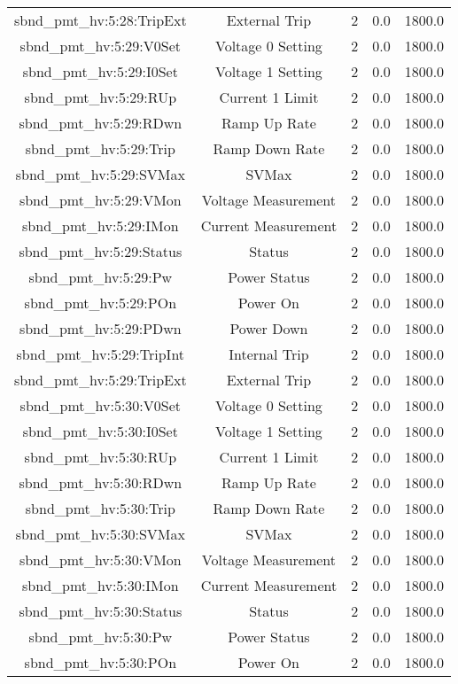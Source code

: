 \begin{center}
\begin{longtable}{c | c c c c }
sbnd\_pmt\_hv:5:28:TripExt & External Trip & 2 & 0.0 & 1800.0\\ 
sbnd\_pmt\_hv:5:29:V0Set & Voltage 0 Setting & 2 & 0.0 & 1800.0\\ 
sbnd\_pmt\_hv:5:29:I0Set & Voltage 1 Setting & 2 & 0.0 & 1800.0\\ 
sbnd\_pmt\_hv:5:29:RUp & Current 1 Limit & 2 & 0.0 & 1800.0\\ 
sbnd\_pmt\_hv:5:29:RDwn & Ramp Up Rate & 2 & 0.0 & 1800.0\\ 
sbnd\_pmt\_hv:5:29:Trip & Ramp Down Rate & 2 & 0.0 & 1800.0\\ 
sbnd\_pmt\_hv:5:29:SVMax & SVMax & 2 & 0.0 & 1800.0\\ 
sbnd\_pmt\_hv:5:29:VMon & Voltage Measurement & 2 & 0.0 & 1800.0\\ 
sbnd\_pmt\_hv:5:29:IMon & Current Measurement & 2 & 0.0 & 1800.0\\ 
sbnd\_pmt\_hv:5:29:Status & Status & 2 & 0.0 & 1800.0\\ 
sbnd\_pmt\_hv:5:29:Pw & Power Status & 2 & 0.0 & 1800.0\\ 
sbnd\_pmt\_hv:5:29:POn & Power On & 2 & 0.0 & 1800.0\\ 
sbnd\_pmt\_hv:5:29:PDwn & Power Down & 2 & 0.0 & 1800.0\\ 
sbnd\_pmt\_hv:5:29:TripInt & Internal Trip & 2 & 0.0 & 1800.0\\ 
sbnd\_pmt\_hv:5:29:TripExt & External Trip & 2 & 0.0 & 1800.0\\ 
sbnd\_pmt\_hv:5:30:V0Set & Voltage 0 Setting & 2 & 0.0 & 1800.0\\ 
sbnd\_pmt\_hv:5:30:I0Set & Voltage 1 Setting & 2 & 0.0 & 1800.0\\ 
sbnd\_pmt\_hv:5:30:RUp & Current 1 Limit & 2 & 0.0 & 1800.0\\ 
sbnd\_pmt\_hv:5:30:RDwn & Ramp Up Rate & 2 & 0.0 & 1800.0\\ 
sbnd\_pmt\_hv:5:30:Trip & Ramp Down Rate & 2 & 0.0 & 1800.0\\ 
sbnd\_pmt\_hv:5:30:SVMax & SVMax & 2 & 0.0 & 1800.0\\ 
sbnd\_pmt\_hv:5:30:VMon & Voltage Measurement & 2 & 0.0 & 1800.0\\ 
sbnd\_pmt\_hv:5:30:IMon & Current Measurement & 2 & 0.0 & 1800.0\\ 
sbnd\_pmt\_hv:5:30:Status & Status & 2 & 0.0 & 1800.0\\ 
sbnd\_pmt\_hv:5:30:Pw & Power Status & 2 & 0.0 & 1800.0\\ 
sbnd\_pmt\_hv:5:30:POn & Power On & 2 & 0.0 & 1800.0\\ 

\end{longtable}
\end{center}

